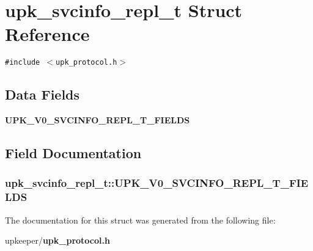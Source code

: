 \section{upk\_\-svcinfo\_\-repl\_\-t Struct Reference}
\label{structupk__svcinfo__repl__t}
{\tt \#include $<$upk\_\-protocol.h$>$}

\subsection*{Data Fields}
\begin{CompactItemize}
\item 
\bf{UPK\_\-V0\_\-SVCINFO\_\-REPL\_\-T\_\-FIELDS}
\end{CompactItemize}


\subsection{Field Documentation}
\subsubsection{\setlength{\rightskip}{0pt plus 5cm}\bf{upk\_\-svcinfo\_\-repl\_\-t::UPK\_\-V0\_\-SVCINFO\_\-REPL\_\-T\_\-FIELDS}}\label{structupk__svcinfo__repl__t_18c9814e48735fd3ec0351bf70bd2a87}




The documentation for this struct was generated from the following file:\begin{CompactItemize}
\item 
upkeeper/\bf{upk\_\-protocol.h}\end{CompactItemize}
